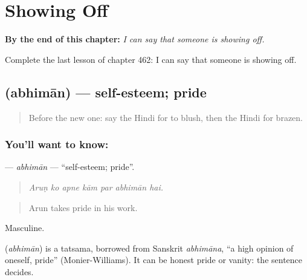
\chapter{Showing Off}
\label{ch:hi-showing-off}

\begin{chapteropening}
\textbf{By the end of this chapter:} \emph{I can say that someone is showing off.}

Complete the last lesson of chapter 462: I can say that someone is showing off.
\end{chapteropening}

\section[\texorpdfstring{\hi{अभिमान} (abhimān)}{अभिमान (abhimān)}]{ (abhimān) — self-esteem; pride}

\label{lesson:HI-C462-abhiman}



\begin{quote}
Before the new one: say the Hindi for to blush, then the Hindi for brazen.
\end{quote}

\subsection*{You'll want to know: }
\textbf{} — \emph{abhimān} — \textquotedblleft{}self-esteem; pride\textquotedblright{}.

\begin{quote}
      
\end{quote}

\begin{quote}
\emph{Aruṇ ko apne kām par abhimān hai.}
\end{quote}

\begin{quote}
Arun takes pride in his work.
\end{quote}

Masculine.

\begin{cousinweb}
\textbf{} (\emph{abhimān}) is a tatsama, borrowed from Sanskrit \emph{abhimāna}, \textquotedblleft{}a high opinion of oneself, pride\textquotedblright{} (Monier-Williams). It can be honest pride or vanity: the sentence decides.
\end{cousinweb}

